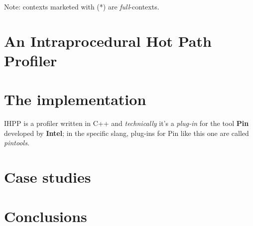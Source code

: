 \documentclass[a4paper,11pt]{report}
\begin{document}

Note: contexts marketed with (*) are \emph{full}-contexts.


\chapter{An Intraprocedural Hot Path Profiler}

\chapter{The implementation}

IHPP is a profiler written in C++ and \emph{technically} it's a \emph{plug-in}
for the tool \textbf{Pin} developed by \textbf{Intel}; in the specific slang,
plug-ins for Pin like this one are called \emph{pintools}.

\chapter{Case studies}


\chapter{Conclusions}

{}

\end{document}
